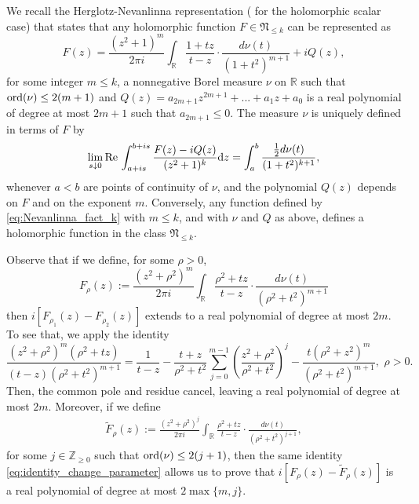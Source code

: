 \documentclass[a4paper,reqno,12pt]{amsart}
\newcommand{\NN}{\mathfrak{N}}
\newcommand{\z}{\mathbb{Z}}
\renewcommand{\r}{\mathbb{R}}
\newcommand{\ord}{{\rm ord}}
\renewcommand{\d}{\mathrm{d}}
\newcommand{\cd}{\cdot}
\newcommand{\1}{{\bf 1}}
\renewcommand{\Re}{{\rm Re}\,}
\begin{document}
We recall the Herglotz-Nevanlinna representation (\cite[Proposition 2.1]{DL} for the holomorphic scalar case) that states that any holomorphic function $F\in\NN_{\leq k}$ can be represented as
\begin{equation}
\label{eq:Nevanlinna_fact_k}
F(z)=\frac{(z^2+1)^{m}}{2\pi i}\int_{\r} \frac{1+tz}{t-z}\cd\frac{d\nu(t)}{(1+t^2)^{m+1}}+iQ(z),
\end{equation}
for some integer $m\leq k$, a nonnegative Borel measure $\nu$ on $\r$ such that $\ord(\nu)\leq 2(m+1)$ and $Q(z)=a_{2m+1}z^{2m+1}+...+a_1z+a_0$ is a real polynomial of degree at most $2m+1$ such that $a_{2m+1}\leq 0$. The measure $\nu$ is uniquely defined in terms of $F$ by
\begin{equation*}
  \lim_{s\downarrow0} \Re \int_{a+is}^{b+is} \frac{F(z)-iQ(z)}{(z^2+1)^k}\d z = \int_{a}^b \frac{\tfrac12 d\nu(t)}{(1+t^2)^{k+1}},  
\end{equation*}
whenever $a<b$ are points of continuity of $\nu$, and the polynomial $Q(z)$ depends on $F$ and on the exponent $m$. Conversely, any function defined by \eqref{eq:Nevanlinna_fact_k} with $m\leq k$, and with $\nu$ and $Q$ as above, defines a holomorphic function in the class $\NN_{\leq k}$.

Observe that if we define, for some $\rho>0$,
\begin{equation}
\label{eq:Nevanlinna_paramenter}
    F_\rho(z):=\frac{(z^2+\rho^2)^{m}}{2\pi i}\int_{\r} \frac{\rho^2+tz}{t-z}\cd\frac{d\nu(t)}{(\rho^2+t^2)^{m+1}}
\end{equation}
then $i[F_{\rho_1}(z)-F_{\rho_2}(z)]$ extends to a real polynomial of degree at most $2m$. To see that, we apply the identity
\begin{equation}
\label{eq:identity_change_parameter}
    \frac{(z^2+\rho^2)^m(\rho^2+tz)}{(t-z)(\rho^2+t^2)^{m+1}}=\frac{1}{t-z}-\frac{t+z}{\rho^2+t^2}\sum_{j=0}^{m-1} \left(\frac{z^2+\rho^2}{\rho^2+t^2}\right)^j-\frac{t(\rho^2+z^2)^m}{(\rho^2+t^2)^ {m+1}},\,\, \rho>0.
\end{equation}
Then, the common pole and residue cancel, leaving a real polynomial of degree at most $2m$. Moreover, if we define
\begin{align*}
    \tilde{F}_\rho(z):=\frac{(z^2+\rho^2)^{j}}{2\pi i}\int_{\r} \frac{\rho^2+tz}{t-z}\cd\frac{d\nu(t)}{(\rho^2+t^2)^{j+1}},
\end{align*}
for some $j\in\z_{\geq0}$ such that $\ord(\nu)\leq2(j+1)$, then the same identity \eqref{eq:identity_change_parameter} allows us to prove that $i[F_\rho(z)-\tilde{F}_\rho(z)]$ is a real polynomial of degree at most $2\max\{m,j\}$.
\end{document}
